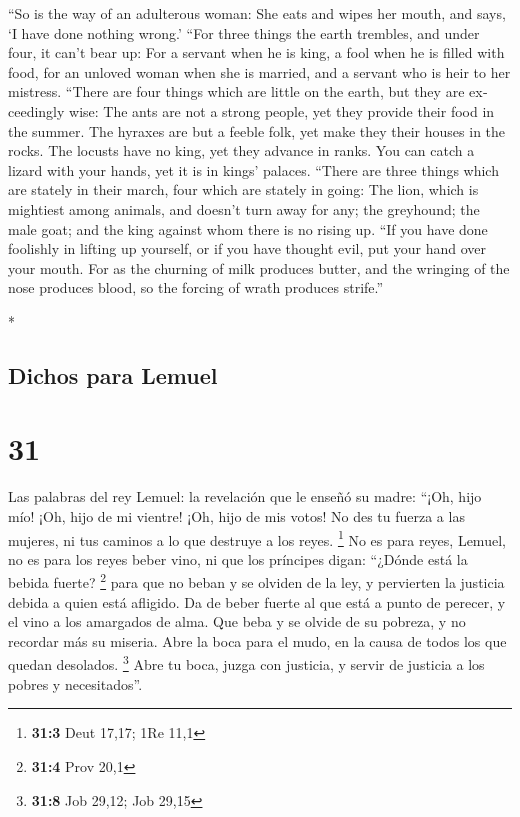 \begin{paracol}{2}
\begin{otherlanguage}{english}
 ``So is the way of an adulterous woman: She eats and
wipes her mouth, and says, `I have done nothing wrong.' 
``For three things the earth trembles, and under four, it can't bear up:
 For a servant when he is king, a fool when he is filled
with food,  for an unloved woman when she is married, and
a servant who is heir to her mistress.  ``There are four
things which are little on the earth, but they are exceedingly wise:
 The ants are not a strong people, yet they provide their
food in the summer.  The hyraxes are but a feeble folk,
yet make they their houses in the rocks.  The locusts
have no king, yet they advance in ranks.  You can catch a
lizard with your hands, yet it is in kings' palaces. 
``There are three things which are stately in their march, four which
are stately in going:  The lion, which is mightiest among
animals, and doesn't turn away for any;  the greyhound;
the male goat; and the king against whom there is no rising up.
 ``If you have done foolishly in lifting up yourself, or
if you have thought evil, put your hand over your mouth. 
For as the churning of milk produces butter, and the wringing of the
nose produces blood, so the forcing of wrath produces strife.''

\end{otherlanguage}

\switchcolumn[0]*

\hypertarget{dichos-para-lemuel}{%
\subsection{Dichos para Lemuel}\label{dichos-para-lemuel}}

\hypertarget{section-60}{%
\section{31}\label{section-60}}

 Las palabras del rey Lemuel: la revelación que le enseñó
su madre:  ``¡Oh, hijo mío! ¡Oh, hijo de mi vientre! ¡Oh,
hijo de mis votos!  No des tu fuerza a las mujeres, ni tus
caminos a lo que destruye a los reyes. \footnote{\textbf{31:3} Deut
  17,17; 1Re 11,1}  No es para reyes, Lemuel, no es para
los reyes beber vino, ni que los príncipes digan: ``¿Dónde está la
bebida fuerte? \footnote{\textbf{31:4} Prov 20,1}  para
que no beban y se olviden de la ley, y pervierten la justicia debida a
quien está afligido.  Da de beber fuerte al que está a
punto de perecer, y el vino a los amargados de alma.  Que
beba y se olvide de su pobreza, y no recordar más su miseria.
 Abre la boca para el mudo, en la causa de todos los que
quedan desolados. \footnote{\textbf{31:8} Job 29,12; Job 29,15}
 Abre tu boca, juzga con justicia, y servir de justicia a
los pobres y necesitados''.


\end{paracol}
